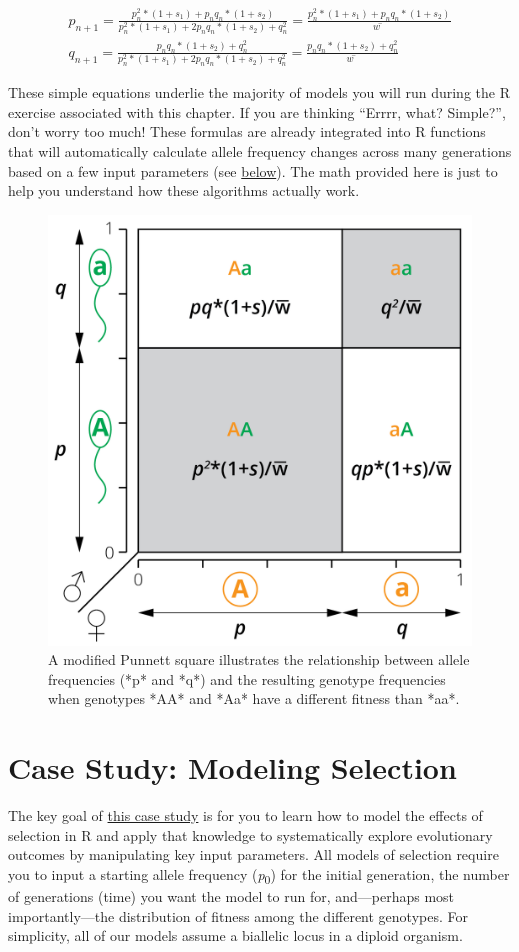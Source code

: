 \documentclass[
]{book}
\begin{document}
\begin{align}
p_{n+1}=\frac{p_n^2*(1+s_1)+p_nq_n*(1+s_2)}{p_n^2*(1+s_1)+2p_nq_n*(1+s_2)+q_n^2}=\frac{p_n^2*(1+s_1)+p_nq_n*(1+s_2)}{w̄} \label{eq:17}\\
q_{n+1}=\frac{p_nq_n*(1+s_2)+q_n^2}{p_n^2*(1+s_1)+2p_nq_n*(1+s_2)+q_n^2}=\frac{p_nq_n*(1+s_2)+q_n^2}{w̄} \label{eq:18} 
\end{align}

These simple equations underlie the majority of models you will run during the R exercise associated with this chapter. If you are thinking ``Errrr, what? Simple?'', don't worry too much! These formulas are already integrated into R functions that will automatically calculate allele frequency changes across many generations based on a few input parameters (see \protect\hyperlink{practical-skills}{below}). The math provided here is just to help you understand how these algorithms actually work.

\begin{figure}
\includegraphics[width=0.5\linewidth]{images/HWE_sel} \caption{A modified Punnett square illustrates the relationship between allele frequencies (*p* and *q*) and the resulting genotype frequencies when genotypes *AA* and *Aa* have a different fitness than *aa*.}\label{fig:punnett2}
\end{figure}

\hypertarget{case-study-modeling-selection}{%
\section{Case Study: Modeling Selection}\label{case-study-modeling-selection}}

The key goal of \href{exercises/BIOL520-ex4.zip}{this case study} is for you to learn how to model the effects of selection in R and apply that knowledge to systematically explore evolutionary outcomes by manipulating key input parameters. All models of selection require you to input a starting allele frequency (\emph{p}\textsubscript{0}) for the initial generation, the number of generations (time) you want the model to run for, and---perhaps most importantly---the distribution of fitness among the different genotypes. For simplicity, all of our models assume a biallelic locus in a diploid organism.
\end{document}
